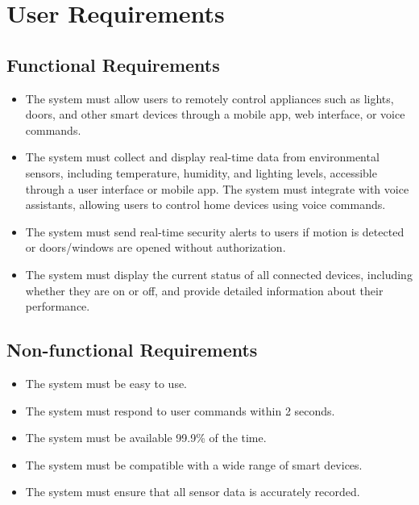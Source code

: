 \section{User Requirements}
\subsection{Functional Requirements}
\begin{itemize}
    \item The system must allow users to remotely control appliances such as lights, doors, and other smart devices through a mobile app, web interface, or voice commands.
    \item The system must collect and display real-time data from environmental sensors, including temperature, humidity, and lighting levels, accessible through a user interface or mobile app. The system must integrate with voice assistants, allowing users to control home devices using voice commands.
    \item The system must send real-time security alerts to users if motion is detected or doors/windows are opened without authorization.
    \item The system must display the current status of all connected devices, including whether they are on or off, and provide detailed information about their performance.
\end{itemize}
\subsection{Non-functional Requirements}
\begin{itemize}
    \item The system must be easy to use.
    \item The system must respond to user commands within 2 seconds.
    \item The system must be available 99.9\% of the time.
    \item The system must be compatible with a wide range of smart devices.
    \item The system must ensure that all sensor data is accurately recorded.
\end{itemize}